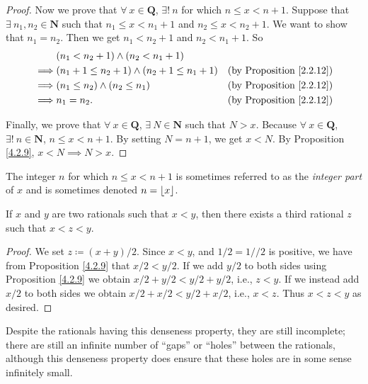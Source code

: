 \begin{proof}
Now we prove that \(\forall\ x \in \mathbf{Q}\), \(\exists!\ n\) for which \(n \leq x < n + 1\).
Suppose that \(\exists\ n_1, n_2 \in \mathbf{N}\) such that \(n_1 \leq x < n_1 + 1\) and \(n_2 \leq x < n_2 + 1\).
We want to show that \(n_1 = n_2\).
Then we get \(n_1 < n_2 + 1\) and \(n_2 < n_1 + 1\).
So
\begin{align*}
& (n_1 < n_2 + 1) \land (n_2 < n_1 + 1) \\
\implies & (n_1 + 1 \leq n_2 + 1) \land (n_2 + 1 \leq n_1 + 1) & \text{(by Proposition \ref{2.2.12})} \\
\implies & (n_1 \leq n_2) \land (n_2 \leq n_1) & \text{(by Proposition \ref{2.2.12})} \\
\implies & n_1 = n_2. & \text{(by Proposition \ref{2.2.12})}
\end{align*}

Finally, we prove that \(\forall\ x \in \mathbf{Q}\), \(\exists\ N \in \mathbf{N}\) such that \(N > x\).
Because \(\forall\ x \in \mathbf{Q}\), \(\exists!\ n \in \mathbf{N}\), \(n \leq x < n + 1\).
By setting \(N = n + 1\), we get \(x < N\).
By Proposition \ref{4.2.9}, \(x < N \implies N > x\).
\end{proof}

\begin{remark}\label{4.4.2}
The integer \(n\) for which \(n \leq x < n + 1\) is sometimes referred to as the \emph{integer part} of \(x\) and is sometimes denoted \(n = \floor*{x}\).
\end{remark}

\begin{proposition}\label{4.4.3}
If \(x\) and \(y\) are two rationals such that \(x < y\), then there exists a third rational \(z\) such that \(x < z < y\).
\end{proposition}

\begin{proof}
We set \(z \coloneqq (x + y) / 2\).
Since \(x < y\), and \(1 / 2 = 1 // 2\) is positive, we have from Proposition \ref{4.2.9} that \(x / 2 < y / 2\).
If we add \(y / 2\) to both sides using Proposition \ref{4.2.9} we obtain \(x / 2 + y / 2 < y / 2 + y / 2\), i.e., \(z < y\).
If we instead add \(x / 2\) to both sides we obtain \(x / 2 + x / 2 < y / 2 + x / 2\), i.e., \(x < z\).
Thus \(x < z < y\) as desired.
\end{proof}

\begin{note}
Despite the rationals having this denseness property, they are still incomplete;
there are still an infinite number of ``gaps'' or ``holes'' between the rationals, although this denseness property does ensure that these holes are in some sense infinitely small.
\end{note}

